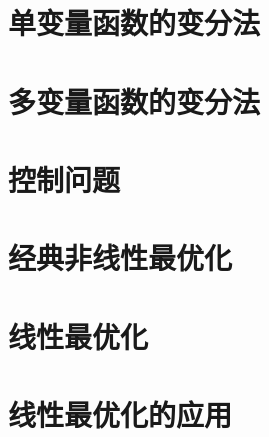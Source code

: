 \chapter{单变量函数的变分法}
\chapter{多变量函数的变分法}
\chapter{控制问题}
\chapter{经典非线性最优化}
\chapter{线性最优化}
\chapter{线性最优化的应用}
